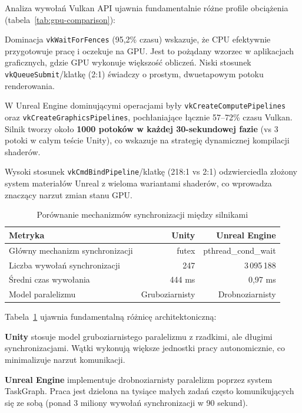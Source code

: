 Analiza wywołań Vulkan API ujawnia fundamentalnie różne profile obciążenia (tabela~\ref{tab:gpu-comparison}):

Dominacja \texttt{vkWaitForFences} (95,2\% czasu) wskazuje, że CPU efektywnie 
przygotowuje pracę i oczekuje na GPU.
Jest to pożądany wzorzec w aplikacjach graficznych, gdzie GPU wykonuje 
większość obliczeń. Niski stosunek
\texttt{vkQueueSubmit}/klatkę (2:1) świadczy o prostym, dwuetapowym potoku 
renderowania.

W Unreal Engine dominującymi operacjami były \texttt{vkCreateComputePipelines} 
oraz \texttt{vkCreateGraphicsPipelines},
pochłaniające łącznie 57--72\% czasu Vulkan. Silnik tworzy około \textbf{1000 potoków w każdej 30-sekundowej fazie}
(vs 3 potoki w całym teście Unity), co wskazuje na strategię dynamicznej kompilacji shaderów.

Wysoki stosunek \texttt{vkCmdBindPipeline}/klatkę (218:1 vs 2:1) odzwierciedla złożony system materiałów Unreal
z wieloma wariantami shaderów, co wprowadza znaczący narzut zmian stanu GPU.


\begin{table}[H]
\centering
\caption{Porównanie mechanizmów synchronizacji między silnikami}
\label{tab:threading-comparison}
\small
\begin{tabular}{|l|r|r|}
\hline
\textbf{Metryka} & \textbf{Unity} & \textbf{Unreal Engine} \\
\hline
Główny mechanizm synchronizacji & futex & pthread\_cond\_wait \\
Liczba wywołań synchronizacji & 247 & 3\,095\,188 \\
Średni czas wywołania & 444 ms & 0,97 ms \\
Model paralelizmu & Gruboziarnisty & Drobnoziarnisty \\
\hline
\end{tabular}
\end{table}

Tabela~\ref{tab:threading-comparison} ujawnia fundamentalną różnicę architektoniczną:

\textbf{Unity} stosuje model gruboziarnistego paralelizmu z rzadkimi, ale długimi synchronizacjami. Wątki wykonują
większe jednostki pracy autonomicznie, co minimalizuje narzut komunikacji.

\textbf{Unreal Engine} implementuje drobnoziarnisty paralelizm poprzez system TaskGraph. Praca jest dzielona na tysiące
małych zadań często komunikujących się ze sobą (ponad 3 miliony wywołań synchronizacji w 90 sekund).

